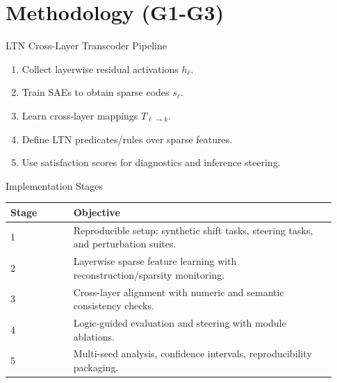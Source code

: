 \section{Methodology (G1-G3)}

\begin{frame}{LTN Cross-Layer Transcoder Pipeline}
    \begin{enumerate}
        \item Collect layerwise residual activations $h_\ell$.
        \item Train SAEs to obtain sparse codes $s_\ell$.
        \item Learn cross-layer mappings $T_{\ell\to k}$.
        \item Define LTN predicates/rules over sparse features.
        \item Use satisfaction scores for diagnostics and inference steering.
    \end{enumerate}
\end{frame}

\begin{frame}{Implementation Stages}
    \small
    \begin{table}
        \centering
        \begin{tabular}{p{0.18\linewidth}p{0.75\linewidth}}
            \toprule
            \textbf{Stage} & \textbf{Objective} \\
            \midrule
            1 & Reproducible setup: synthetic shift tasks, steering tasks, and perturbation suites. \\
            2 & Layerwise sparse feature learning with reconstruction/sparsity monitoring. \\
            3 & Cross-layer alignment with numeric and semantic consistency checks. \\
            4 & Logic-guided evaluation and steering with module ablations. \\
            5 & Multi-seed analysis, confidence intervals, reproducibility packaging. \\
            \bottomrule
        \end{tabular}
    \end{table}
\end{frame}

